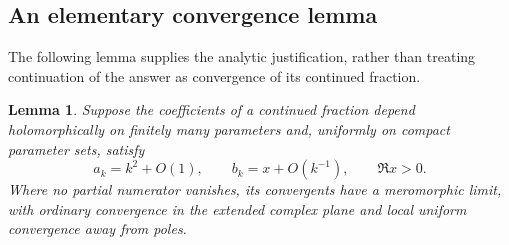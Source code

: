 \documentclass[11pt]{article}
\newtheorem{lemma}{Lemma}
\begin{document}
\subsection*{An elementary convergence lemma}
The following lemma supplies the analytic justification, rather
than treating continuation of the answer as convergence of its
continued fraction.

\begin{lemma}\label{convergence}
Suppose the coefficients of a continued fraction depend
holomorphically on finitely many parameters and, uniformly on compact
parameter sets, satisfy
\[
 a_k=k^2+O(1),\qquad b_k=x+O(k^{-1}),\qquad \Re x>0.
\]
Where no partial numerator vanishes, its convergents have a
meromorphic limit, with ordinary convergence in the extended
complex plane and local uniform convergence away from poles.
\end{lemma}
\end{document}
